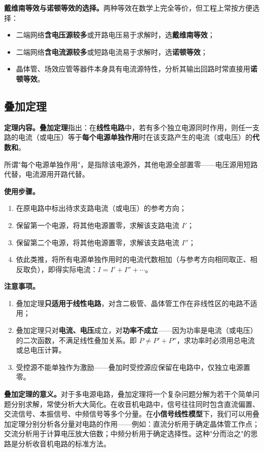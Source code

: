 \documentclass[12pt,UTF8]{ctexbook}
\begin{document}
\textbf{戴维南等效与诺顿等效的选择。}两种等效在数学上完全等价，但工程上常按方便选择：
\begin{itemize}
  \item 二端网络\textbf{含电压源较多}或开路电压易于求解时，选\textbf{戴维南等效}；
  \item 二端网络\textbf{含电流源较多}或短路电流易于求解时，选\textbf{诺顿等效}；
  \item 晶体管、场效应管等器件本身具有电流源特性，分析其输出回路时常直接用\textbf{诺顿等效}。
\end{itemize}

\subsection{叠加定理}

\textbf{定理内容。}\textbf{叠加定理}指出：在\textbf{线性电路}中，若有多个独立电源同时作用，则任一支路的电流（或电压）等于\textbf{每个电源单独作用}时在该支路产生的电流（或电压）的\textbf{代数和}。

所谓"每个电源单独作用"，是指除该电源外，其他电源全部置零——电压源用短路代替，电流源用开路代替。

\textbf{使用步骤。}
\begin{enumerate}
  \item 在原电路中标出待求支路电流（或电压）的参考方向；
  \item 保留第一个电源，将其他电源置零，求解该支路电流 $I'$；
  \item 保留第二个电源，将其他电源置零，求解该支路电流 $I''$；
  \item 依此类推，将所有电源单独作用时的电流代数相加（与参考方向相同取正、相反取负），即得实际电流：$I = I' + I'' + \cdots$。
\end{enumerate}

\textbf{注意事项。}
\begin{enumerate}
  \item 叠加定理\textbf{只适用于线性电路}，对含二极管、晶体管工作在非线性区的电路不适用；
  \item 叠加定理只对\textbf{电流、电压}成立，对\textbf{功率不成立}——因为功率是电流（或电压）的二次函数，不满足线性叠加关系。即 $P \neq P' + P''$，求功率时必须用总电流或总电压计算。
  \item 受控源不能单独作为激励——叠加时受控源应保留在电路中，仅独立电源置零。
\end{enumerate}

\textbf{叠加定理的意义。}对于多电源电路，叠加定理将一个复杂问题分解为若干个简单问题分别求解，常使分析大大简化。在收音机电路中，信号往往同时包含直流偏置、交流信号、本振信号、中频信号等多个分量。在\textbf{小信号线性模型}下，我们可以用叠加定理分别分析各分量对电路的作用——例如：直流分析用于确定晶体管工作点；交流分析用于计算电压放大倍数；中频分析用于确定选择性。这种"分而治之"的思路是分析收音机电路的标准方法。
\end{document}
